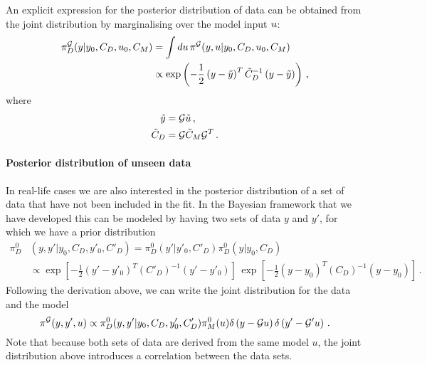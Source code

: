 An explicit expression for the posterior distribution of data can be obtained
from the joint distribution by marginalising over the model input $u$:
\begin{align}
  \label{eq:PosteriorDataSpace}
  \pi_D^{\mathcal{G}}(y|y_0,C_{D},u_0,C_M)
  &= \int du\, 
  \pi^{\mathcal{G}}(y,u|y_0,C_{D},u_0,C_M) \\
  &\propto \exp\left(
    -\frac12 \left(y - \tilde{y}\right)^T \tilde{C}_D^{-1}
    \left(y - \tilde{y}\right)
  \right)\, ,
\end{align}
where
\begin{align}
  \label{eq:PosteriorDataParamsMean}
  \tilde{y} &= \mathcal{G} \tilde{u}\, , \\
  \label{eq:PosteriorDataParamsCov}
  \tilde{C}_D &= \mathcal{G} \tilde{C}_M \mathcal{G}^T\, .
\end{align}

\paragraph{Posterior distribution of unseen data}

In real-life cases we are also interested in the posterior distribution of a set
of data that have not been included in the fit. In the Bayesian framework that
we have developed this can be modeled by having two sets of data $y$ and $y'$,
for which we have a prior distribution 
\begin{align}
  \label{eq:JointIndepDataPrior}
  \pi_D^0&\left(y,y'|y_0,C_D,y'_0,C'_D\right) 
   = \pi_D^0\left(y'|y'_0,C'_D\right) \pi_D^0\left(y|y_0,C_D\right) \\
  & \propto 
  \exp\left[-\frac12 \left(y'-y'_0\right)^T (C'_D)^{-1} 
  \left(y'-y'_0\right)\right]\, 
  \exp\left[-\frac12 \left(y-y_0\right)^T (C_D)^{-1} 
  \left(y-y_0\right)\right]\, .
\end{align}
Following the derivation above, we can write the joint distribution for the data
and the model 
\begin{equation}
  \label{eq:JointModelData}
  \pi^{\mathcal{G}}(y,y',u) 
  \propto 
  \pi_D^0(y,y'|y_0,C_D,y'_0,C'_D) \pi_M^0(u) 
  \delta\left(y - \mathcal{G}u\right)
  \delta\left(y'- \mathcal{G}'u\right)\, .
\end{equation}
Note that because both sets of data are derived from the same model $u$, the
joint distribution above introduces a correlation between the data sets. 

